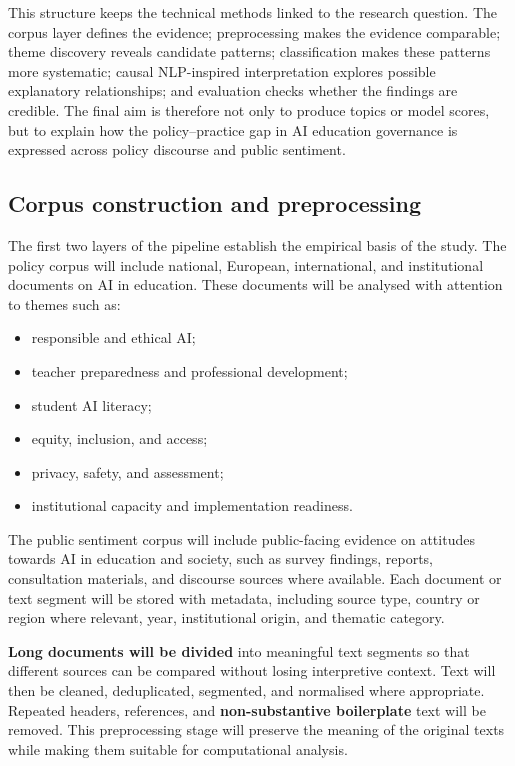 \documentclass{article}
\begin{document}
This structure keeps the technical methods linked to the research question. The
corpus layer defines the evidence; preprocessing makes the evidence comparable;
theme discovery reveals candidate patterns; classification makes these patterns
more systematic; causal NLP-inspired interpretation explores possible
explanatory relationships; and evaluation checks whether the findings are
credible. The final aim is therefore not only to produce topics or model scores,
but to explain how the policy--practice gap in AI education governance is
expressed across policy discourse and public sentiment.

\subsection{Corpus construction and preprocessing}

The first two layers of the pipeline establish the empirical basis of the study.
The policy corpus will include national, European, international, and
institutional documents on AI in education. These documents will be analysed
with attention to themes such as:

\begin{itemize}[leftmargin=*]
    \item responsible and ethical AI;
    \item teacher preparedness and professional development;
    \item student AI literacy;
    \item equity, inclusion, and access;
    \item privacy, safety, and assessment;
    \item institutional capacity and implementation readiness.
\end{itemize}

The public sentiment corpus will include public-facing evidence on attitudes
towards AI in education and society, such as survey findings, reports,
consultation materials, and discourse sources where available. Each document or
text segment will be stored with metadata, including source type, country or
region where relevant, year, institutional origin, and thematic category.

\textbf{Long documents will be divided} into meaningful text segments so that different
sources can be compared without losing interpretive context. Text will then be
cleaned, deduplicated, segmented, and normalised where appropriate. Repeated
headers, references, and \textbf{non-substantive boilerplate} text will be removed. This
preprocessing stage will preserve the meaning of the original texts while making
them suitable for computational analysis.
\end{document}
